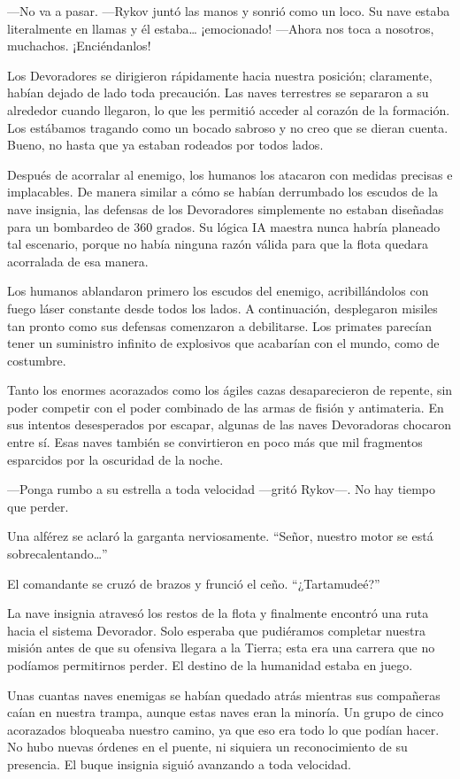 —No va a pasar. —Rykov juntó las manos y sonrió como un loco. Su nave estaba literalmente en llamas y él estaba… ¡emocionado! —Ahora nos toca a nosotros, muchachos. ¡Enciéndanlos!

Los Devoradores se dirigieron rápidamente hacia nuestra posición; claramente, habían dejado de lado toda precaución. Las naves terrestres se separaron a su alrededor cuando llegaron, lo que les permitió acceder al corazón de la formación. Los estábamos tragando como un bocado sabroso y no creo que se dieran cuenta. Bueno, no hasta que ya estaban rodeados por todos lados.

Después de acorralar al enemigo, los humanos los atacaron con medidas precisas e implacables. De manera similar a cómo se habían derrumbado los escudos de la nave insignia, las defensas de los Devoradores simplemente no estaban diseñadas para un bombardeo de 360 grados. Su lógica IA maestra nunca habría planeado tal escenario, porque no había ninguna razón válida para que la flota quedara acorralada de esa manera.

Los humanos ablandaron primero los escudos del enemigo, acribillándolos con fuego láser constante desde todos los lados. A continuación, desplegaron misiles tan pronto como sus defensas comenzaron a debilitarse. Los primates parecían tener un suministro infinito de explosivos que acabarían con el mundo, como de costumbre.

Tanto los enormes acorazados como los ágiles cazas desaparecieron de repente, sin poder competir con el poder combinado de las armas de fisión y antimateria. En sus intentos desesperados por escapar, algunas de las naves Devoradoras chocaron entre sí. Esas naves también se convirtieron en poco más que mil fragmentos esparcidos por la oscuridad de la noche.

—Ponga rumbo a su estrella a toda velocidad —gritó Rykov—. No hay tiempo que perder.

Una alférez se aclaró la garganta nerviosamente. ``Señor, nuestro motor se está sobrecalentando…''


El comandante se cruzó de brazos y frunció el ceño. ``¿Tartamudeé?''


La nave insignia atravesó los restos de la flota y finalmente encontró una ruta hacia el sistema Devorador. Solo esperaba que pudiéramos completar nuestra misión antes de que su ofensiva llegara a la Tierra; esta era una carrera que no podíamos permitirnos perder. El destino de la humanidad estaba en juego.

Unas cuantas naves enemigas se habían quedado atrás mientras sus compañeras caían en nuestra trampa, aunque estas naves eran la minoría. Un grupo de cinco acorazados bloqueaba nuestro camino, ya que eso era todo lo que podían hacer. No hubo nuevas órdenes en el puente, ni siquiera un reconocimiento de su presencia. El buque insignia siguió avanzando a toda velocidad.

